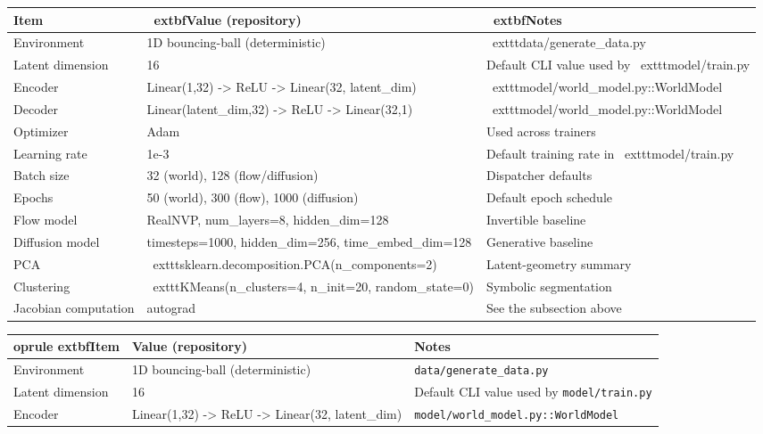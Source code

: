\documentclass[11pt]{article}
\begin{document}
\begin{table}[h]
\centering
\small
\begin{tabular}{p{} p{} p{}}
\toprule
\textbf{Item} & \	extbf{Value (repository)} & \	extbf{Notes} \\\midrule
Environment & 1D bouncing-ball (deterministic) & \	exttt{data/generate_data.py} \\Latent dimension & 16 & Default CLI value used by \	exttt{model/train.py} \\Encoder & Linear(1,32) -> ReLU -> Linear(32, latent\_dim) & \	exttt{model/world\_model.py::WorldModel} \\Decoder & Linear(latent\_dim,32) -> ReLU -> Linear(32,1) & \	exttt{model/world\_model.py::WorldModel} \\Optimizer & Adam & Used across trainers \\Learning rate & 1e-3 & Default training rate in \	exttt{model/train.py} \\Batch size & 32 (world), 128 (flow/diffusion) & Dispatcher defaults \\Epochs & 50 (world), 300 (flow), 1000 (diffusion) & Default epoch schedule \\Flow model & RealNVP, num_layers=8, hidden_dim=128 & Invertible baseline \\Diffusion model & timesteps=1000, hidden_dim=256, time_embed_dim=128 & Generative baseline \\PCA & \	exttt{sklearn.decomposition.PCA(n_components=2)} & Latent-geometry summary \\Clustering & \	exttt{KMeans(n_clusters=4, n_init=20, random_state=0)} & Symbolic segmentation \\Jacobian computation & autograd & See the subsection above \\\bottomrule
\end{tabular}
\begin{table}[h]
\centering
\small
\begin{tabular}{p{} p{} p{}}
	oprule
	extbf{Item} & \textbf{Value (repository)} & \textbf{Notes} \\
\midrule
Environment & 1D bouncing-ball (deterministic) & \texttt{data/generate_data.py} \\
Latent dimension & 16 & Default CLI value used by \texttt{model/train.py} \\
Encoder & Linear(1,32) -> ReLU -> Linear(32, latent\_dim) & \texttt{model/world\_model.py::WorldModel} \\

\end{tabular}
\end{table}
\end{table}
\end{document}
